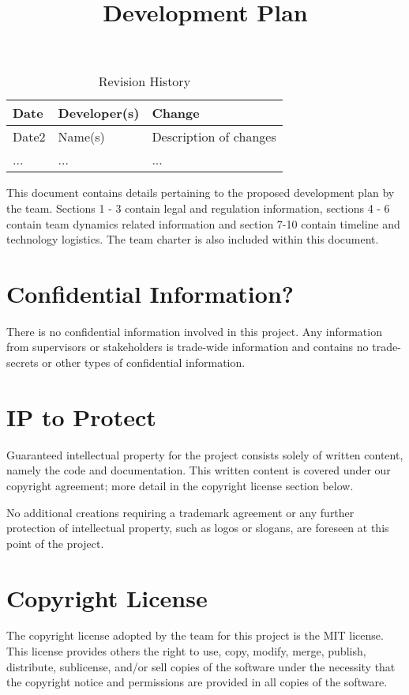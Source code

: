 \documentclass{article}
\title{Development Plan\\\progname}
\author{\authname}
\date{}
\begin{document}
\maketitle

\begin{table}[hp]
\caption{Revision History} \label{TblRevisionHistory}
\begin{tabularx}{\textwidth}{llX}
\toprule
\textbf{Date} & \textbf{Developer(s)} & \textbf{Change}\\
\midrule
Date2 & Name(s) & Description of changes\\
... & ... & ...\\
\bottomrule
\end{tabularx}
\end{table}

\newpage{}


This document contains details pertaining to the proposed development plan by the team.
Sections 1 - 3 contain legal and regulation information, sections 4 - 6 contain team dynamics related information and 
section 7-10 contain timeline and technology logistics. The team charter is also included within this document. \\


\section{Confidential Information?}
There is no confidential information involved in this project. Any information
from supervisors or stakeholders is trade-wide information and contains
no trade-secrets or other types of confidential information.

\section{IP to Protect}
Guaranteed intellectual property for the project consists solely of written
content, namely the code and documentation. This written content is covered
under our copyright agreement; more detail in the copyright license section
below.

No additional creations requiring a trademark agreement or any further
protection of intellectual property, such as logos or slogans, are foreseen
at this point of the project.

\section{Copyright License}
The copyright license adopted by the team for this project is the MIT license.
This license provides others the right to use, copy, modify, merge, publish,
distribute, sublicense, and/or sell copies of the software under the necessity
that the copyright notice and permissions are provided in all copies of the software.
\end{document}
